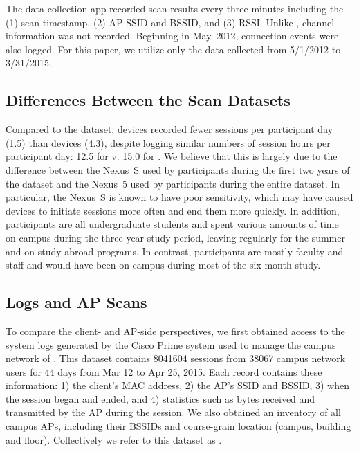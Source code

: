 The \NetSense{} data collection app recorded scan results every three
minutes including the (1) scan timestamp, (2) AP SSID and BSSID, and (3) RSSI.
Unlike \ubscan{}, channel information was not recorded.  Beginning in May~2012,
\wifi{} connection events were also logged. For this paper, we utilize only the
data collected from 5/1/2012 to 3/31/2015.

\subsection{Differences Between the Scan Datasets}


Compared to the \ubscan{} dataset, \NetSense{} devices recorded fewer
sessions per participant day (1.5) than \PhoneLab{} devices (4.3), despite
logging similar numbers of session hours per participant day: 12.5 for
\ndscan{} v. 15.0 for \ubscan{}. We believe that this is largely due to the
difference between the Nexus~S used by \NetSense{} participants during the
first two years of the \ndscan{} dataset and the Nexus~5 used by \PhoneLab{}
participants during the entire \ubscan{} dataset. In particular, the Nexus~S
is known to have poor \wifi{} sensitivity, which may have caused \NetSense{}
devices to initiate sessions more often and end them more quickly. In
addition, \NetSense{} participants are all undergraduate students and spent
various amounts of time on-campus during the three-year study period, leaving
regularly for the summer and on study-abroad programs. In contrast,
\PhoneLab{} participants are mostly faculty and staff and would have been on campus
during most of the six-month study.

\subsection{\ub{} \wifi{} Logs and AP Scans}
\label{subsec:cit}

To compare the client- and AP-side perspectives, we first obtained access to the
system logs generated by the Cisco Prime system used to manage
the campus \wifi{} network of \ub{}. This dataset contains \num{8041604} \wifi{}
sessions from \num{38067} \ub{} campus network users for 44 days from Mar 12 to
Apr 25, 2015. Each record contains these information: 1) the client's MAC
address, 2) the AP's SSID and BSSID, 3) when the \wifi{} session began and
ended, and 4) statistics such as bytes received and transmitted by the AP during
the session. We also obtained an inventory of all \ub{} campus APs, including
their BSSIDs and course-grain location (campus, building and floor).
Collectively we refer to this dataset as \textbf{\ubap{}}.

